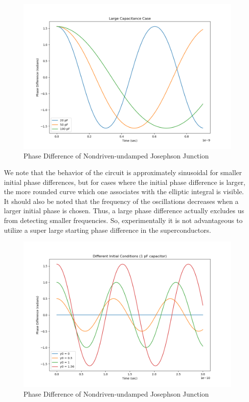 \documentclass[12pt]{article}
\begin{document}
\begin{figure}
\caption{Phase Difference of Nondriven-undamped Josephson Junction}
\begin{center}
\includegraphics[scale=0.60]{uud-jjlargec.png}
\end{center}
\end{figure}


We note that the behavior of the circuit is approximately sinusoidal for smaller initial phase differences, but for cases where the initial phase difference is larger, the more rounded curve which one associates with the elliptic integral is visible.  It should also be noted that the frequency of the oscillations decreases when a larger initial phase is chosen.  Thus, a large phase difference actually excludes us from detecting smaller frequencies.  So, experimentally it is not advantageous to utilize a super large starting phase difference in the superconductors.

\begin{figure}
\caption{Phase Difference of Nondriven-undamped Josephson Junction}
\begin{center}
\includegraphics[scale=0.60]{uud-jjinit.png}
\end{center}
\end{figure}
\end{document}
